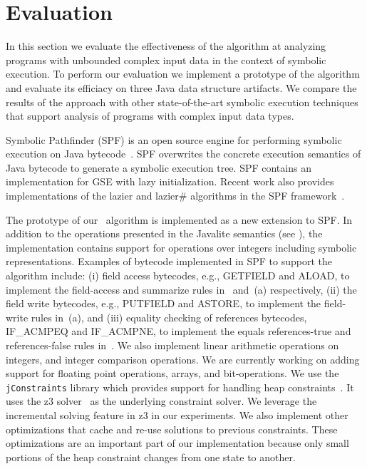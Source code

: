 

\section{Evaluation}
\label{sec:eval}
In this section we evaluate the effectiveness of the \symtxt{}
algorithm at analyzing programs with unbounded complex input data in
the context of symbolic execution. To perform our evaluation
we implement a prototype of the algorithm and evaluate its efficiacy on
three Java data structure artifacts. We compare the results of the
\symtxt{} approach with other state-of-the-art symbolic execution techniques 
that support analysis of programs with complex input data types. 

Symbolic Pathfinder (SPF) is an open source engine for performing symbolic 
execution on Java 
bytecode~\cite{visser:ase03,Pasareanu:ISSTA08,pasareanu:ase10,DBLP:journals/ase/PasareanuVBGMR13}.
SPF overwrites the concrete execution semantics of Java
bytecode to generate a symbolic execution tree. SPF contains an
implementation for GSE with lazy initialization. Recent work also
provides implementations of the lazier and lazier\# algorithms in the
SPF framework~\cite{Hillery:2014}.


The prototype of  our~\symtxt{} algorithm is implemented as a new extension to SPF.
In addition to the operations presented in the Javalite
semantics (see ), the implementation contains 
support for operations over
integers including symbolic representations. Examples of bytecode implemented in SPF to support the \symtxt{} algorithm
include:
(i) field access bytecodes, e.g., GETFIELD and ALOAD, to implement the 
field-access and summarize rules
in~ and~(a) respectively, (ii) the field
write bytecodes, e.g., PUTFIELD and ASTORE, to implement the
field-write rules in~(a), and (iii) equality checking of
references bytecodes, IF\_ACMPEQ and IF\_ACMPNE, to implement the
equals references-true and references-false rules in~.
We also implement linear arithmetic operations on integers, and integer
comparison operations. We are currently working on adding support for
floating point operations, arrays, and bit-operations.  We use the
\texttt{jConstraints} library which provides support for handling heap
constraints~\cite{ase2014-ghilrr,jpf2014-dghirr}. It uses the z3
solver~\cite{deMouraBjorner08Z3} as the underlying constraint solver. We
leverage the incremental solving feature in z3 in our experiments. We
also implement other optimizations that cache and re-use solutions to
previous constraints. These optimizations are an important part of our
implementation because only small portions of the heap constraint
changes from one state to another.


